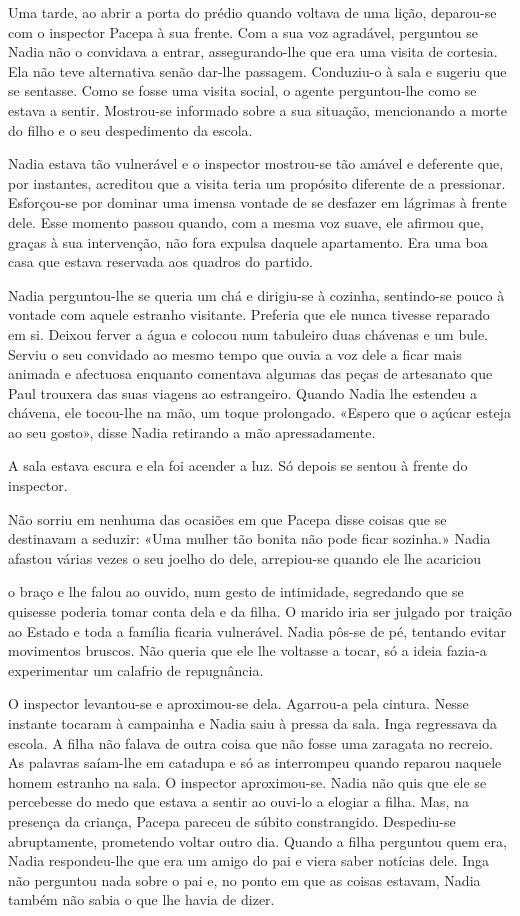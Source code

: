 Uma tarde, ao abrir a porta do prédio quando voltava de uma lição,
deparou-se com o inspector Pacepa à sua frente. Com a sua voz agradável,
perguntou se Nadia não o convidava a entrar, assegurando-lhe que era uma
visita de cortesia. Ela não teve alternativa senão dar-lhe passagem.
Conduziu-o à sala e sugeriu que se sentasse. Como se fosse uma visita
social, o agente perguntou-lhe como se estava a sentir. Mostrou-se
informado sobre a sua situação, mencionando a morte do filho e o seu
despedimento da escola.

Nadia estava tão vulnerável e o inspector mostrou-se tão amável e
deferente que, por instantes, acreditou que a visita teria um propósito
diferente de a pressionar. Esforçou-se por dominar uma imensa vontade de
se desfazer em lágrimas à frente dele. Esse momento passou quando, com
a mesma voz suave, ele afirmou que, graças à sua intervenção, não fora
expulsa daquele apartamento. Era uma boa casa que estava reservada aos
quadros do partido.

Nadia perguntou-lhe se queria um chá e dirigiu-se à cozinha, sentindo-se
pouco à vontade com aquele estranho visitante. Preferia que ele nunca
tivesse reparado em si. Deixou ferver a água e colocou num tabuleiro
duas chávenas e um bule. Serviu o seu convidado ao mesmo tempo que
ouvia a voz dele a ficar mais animada e afectuosa enquanto comentava
algumas das peças de artesanato que Paul trouxera das suas viagens ao
estrangeiro. Quando Nadia lhe estendeu a chávena, ele tocou-lhe na mão,
um toque prolongado. «Espero que o açúcar esteja ao seu gosto», disse
Nadia retirando a mão apressadamente.

A sala estava escura e ela foi acender a luz. Só depois se sentou à
frente do inspector.

Não sorriu em nenhuma das ocasiões em que Pacepa disse coisas que se
destinavam a seduzir: «Uma mulher tão bonita não pode ficar sozinha.»
Nadia afastou várias vezes o seu joelho do dele, arrepiou-se quando ele
lhe acariciou

o braço e lhe falou ao ouvido, num gesto de intimidade, segredando que
se quisesse poderia tomar conta dela e da filha. O marido iria ser
julgado por traição ao Estado e toda a família ficaria vulnerável. Nadia
pôs-se de pé, tentando evitar movimentos bruscos. Não queria que ele
lhe voltasse a tocar, só a ideia fazia-a experimentar um calafrio de
repugnância.

O inspector levantou-se e aproximou-se dela. Agarrou-a pela cintura.
Nesse instante tocaram à campainha e Nadia saiu à pressa da sala. Inga
regressava da escola. A filha não falava de outra coisa que não fosse
uma zaragata no recreio. As palavras saíam-lhe em catadupa e só as
interrompeu quando reparou naquele homem estranho na sala. O inspector
aproximou-se. Nadia não quis que ele se percebesse do medo que estava a
sentir ao ouvi-lo a elogiar a filha. Mas, na presença da criança, Pacepa
pareceu de súbito constrangido. Despediu-se abruptamente, prometendo
voltar outro dia. Quando a filha perguntou quem era, Nadia respondeu-lhe
que era um amigo do pai e viera saber notícias dele. Inga não perguntou
nada sobre o pai e, no ponto em que as coisas estavam, Nadia também não
sabia o que lhe havia de dizer.


